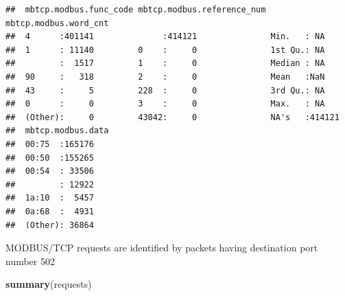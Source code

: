 \documentclass[]{article}
\newenvironment{Shaded}{\begin{snugshade}}{\end{snugshade}}
\newcommand{\KeywordTok}[1]{\textcolor[rgb]{0.13,0.29,0.53}{\textbf{{#1}}}}
\newcommand{\NormalTok}[1]{{#1}}
\begin{document}
\begin{verbatim}
##  mbtcp.modbus.func_code mbtcp.modbus.reference_num mbtcp.modbus.word_cnt
##  4      :401141              :414121               Min.   : NA          
##  1      : 11140         0    :     0               1st Qu.: NA          
##         :  1517         1    :     0               Median : NA          
##  90     :   318         2    :     0               Mean   :NaN          
##  43     :     5         228  :     0               3rd Qu.: NA          
##  0      :     0         3    :     0               Max.   : NA          
##  (Other):     0         43042:     0               NA's   :414121       
##  mbtcp.modbus.data
##  00:75  :165176   
##  00:50  :155265   
##  00:54  : 33506   
##         : 12922   
##  1a:10  :  5457   
##  0a:68  :  4931   
##  (Other): 36864
\end{verbatim}

\pagebreak

MODBUS/TCP requests are identified by packets having destination port
number 502

\begin{Shaded}
\begin{Highlighting}[]
\KeywordTok{summary}\NormalTok{(requests)}
\end{Highlighting}
\end{Shaded}
\end{document}
